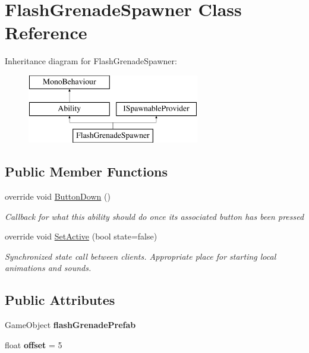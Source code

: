 \hypertarget{class_flash_grenade_spawner}{}\section{Flash\+Grenade\+Spawner Class Reference}
\label{class_flash_grenade_spawner}
Inheritance diagram for Flash\+Grenade\+Spawner\+:\begin{figure}[H]
\begin{center}
\leavevmode
\includegraphics[height=3.000000cm]{class_flash_grenade_spawner}
\end{center}
\end{figure}
\subsection*{Public Member Functions}
\begin{DoxyCompactItemize}
\item 
override void \hyperlink{class_flash_grenade_spawner_a9f578f3c3fcb0ed1be466f37b5b401c5}{Button\+Down} ()
\begin{DoxyCompactList}\small\item\em Callback for what this ability should do once its associated button has been pressed \end{DoxyCompactList}\item 
override void \hyperlink{class_flash_grenade_spawner_a704b6a24aae16c35578a5469f1773bbc}{Set\+Active} (bool state=false)
\begin{DoxyCompactList}\small\item\em Synchronized state call between clients. Appropriate place for starting local animations and sounds. \end{DoxyCompactList}\end{DoxyCompactItemize}
\subsection*{Public Attributes}
\begin{DoxyCompactItemize}
\item 
\hypertarget{class_flash_grenade_spawner_af5e7e0dd2fe57643b05653a9ee7e7c14}{}\label{class_flash_grenade_spawner_af5e7e0dd2fe57643b05653a9ee7e7c14} 
Game\+Object {\bfseries flash\+Grenade\+Prefab}
\item 
\hypertarget{class_flash_grenade_spawner_a5e950c624439b74eefc48b803c4b0bc4}{}\label{class_flash_grenade_spawner_a5e950c624439b74eefc48b803c4b0bc4} 
float {\bfseries offset} = 5
\end{DoxyCompactItemize}
